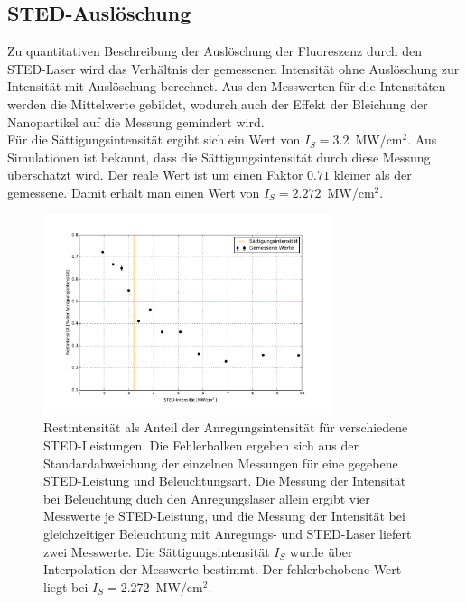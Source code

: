 \subsection{STED-Auslöschung}
Zu quantitativen Beschreibung der Auslöschung der Fluoreszenz durch den STED-Laser wird das Verhältnis der gemessenen Intensität ohne Auslöschung zur Intensität mit Auslöschung berechnet.
Aus den Messwerten für die Intensitäten werden die Mittelwerte gebildet, wodurch auch der Effekt der Bleichung der Nanopartikel auf die Messung gemindert wird.
\\
Für die Sättigungsintensität ergibt sich ein Wert von $I_S = 3.2$~MW/cm$^2$.
Aus Simulationen ist bekannt, dass die Sättigungsintensität durch diese Messung überschätzt wird. Der reale Wert ist um einen Faktor $0.71$ kleiner als der gemessene.
Damit erhält man einen Wert von $I_S = 2.272$~MW/cm$^2$.
\begin{figure}
	\centering
	\includegraphics[width=0.75\textwidth]{plots/depletion.pdf}
	\caption{Restintensität als Anteil der Anregungsintensität für verschiedene STED-Leistungen. 
		Die Fehlerbalken ergeben sich aus der Standardabweichung der einzelnen Messungen für eine gegebene STED-Leistung und Beleuchtungsart. 
		Die Messung der Intensität bei Beleuchtung duch den Anregungslaser allein ergibt vier Messwerte je STED-Leistung, und die Messung der Intensität bei gleichzeitiger Beleuchtung mit Anregungs- und STED-Laser liefert zwei Messwerte.
		Die Sättigungsintensität $I_S$ wurde über Interpolation der Messwerte bestimmt. 
		Der fehlerbehobene Wert liegt bei $I_S = 2.272$~MW/cm$^2$.
}\label{fig:depletion}
\end{figure}

